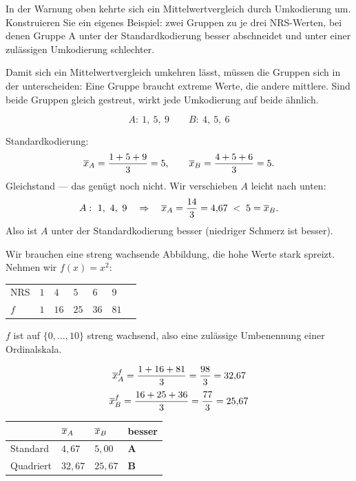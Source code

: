 \begin{aufgabe}
In der Warnung oben kehrte sich ein Mittelwertvergleich durch Umkodierung um. Konstruieren Sie ein eigenes Beispiel: zwei Gruppen zu je drei NRS-Werten, bei denen Gruppe A unter der Standardkodierung besser abschneidet und unter einer zulässigen Umkodierung schlechter.

\loesung
{}
Damit sich ein Mittelwertvergleich umkehren lässt, müssen die Gruppen sich in der  unterscheiden: Eine Gruppe braucht extreme Werte, die andere mittlere. Sind beide Gruppen gleich gestreut, wirkt jede Umkodierung auf beide ähnlich.

\[ A: \ 1,\ 5,\ 9 \qquad B: \ 4,\ 5,\ 6 \]

Standardkodierung:
\[ \overline{x}_A = \frac{1+5+9}{3} = 5, \qquad \overline{x}_B = \frac{4+5+6}{3} = 5 . \]
Gleichstand --- das genügt noch nicht. Wir verschieben $A$ leicht nach unten:
\[ A: \ 1,\ 4,\ 9 \quad\Rightarrow\quad \overline{x}_A = \frac{14}{3} = 4{,}67 \;<\; 5 = \overline{x}_B . \]
Also ist $A$ unter der Standardkodierung besser (niedriger Schmerz ist besser).

Wir brauchen eine streng wachsende Abbildung, die hohe Werte stark spreizt. Nehmen wir $f(x) = x^2$:
\begin{center}
{\small
\renewcommand{\arraystretch}{1.35}
\begin{tabular}{@{}P{1.2cm}P{0.8cm}P{0.8cm}P{0.8cm}P{0.8cm}P{0.8cm}P{0.8cm}@{}}
\toprule
NRS & $1$ & $4$ & $5$ & $6$ & $9$ & \\
$f$ & $1$ & $16$ & $25$ & $36$ & $81$ & \\
\bottomrule
\end{tabular}}
\end{center}
$f$ ist auf $\{0,\ldots,10\}$ streng wachsend, also eine zulässige Umbenennung einer Ordinalskala.

\[ \overline{x}_A^{f} = \frac{1 + 16 + 81}{3} = \frac{98}{3} = 32{,}67 \]
\[ \overline{x}_B^{f} = \frac{16 + 25 + 36}{3} = \frac{77}{3} = 25{,}67 \]

\begin{center}
\renewcommand{\arraystretch}{1.48}
\begin{tabular}{@{}P{2.6cm}P{2.0cm}P{2.0cm}P{1.6cm}@{}}
\toprule
& $\overline{x}_A$ & $\overline{x}_B$ & \textbf{besser}\\
\midrule
Standard & $4{,}67$ & $5{,}00$ & \textbf{A}\\
Quadriert & $32{,}67$ & $25{,}67$ & \textcolor{akzent}{\textbf{B}}\\
\bottomrule
\end{tabular}
\end{center}


\end{aufgabe}
